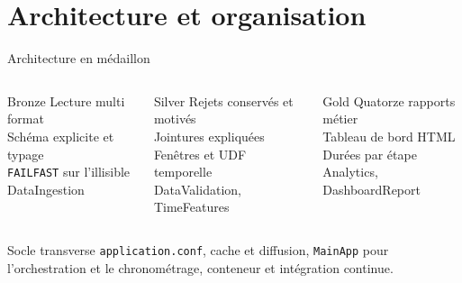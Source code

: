 \documentclass[aspectratio=169,11pt]{beamer}
\newcommand{\legende}[1]{{\color{gris}\footnotesize #1}}
\begin{document}
\section{Architecture et organisation}

\begin{frame}{Architecture en médaillon}
  \vspace{1mm}
  \begin{columns}[t,onlytextwidth]
      \begin{block}{Bronze}
        \footnotesize
        Lecture multi format\\
        Schéma explicite et typage\\
        \texttt{FAILFAST} sur l'illisible\\[2mm]
        \legende{DataIngestion}
      \end{block}
      \begin{block}{Silver}
        \footnotesize
        Rejets conservés et motivés\\
        Jointures expliquées\\
        Fenêtres et UDF temporelle\\[2mm]
        \legende{DataValidation, TimeFeatures}
      \end{block}
      \begin{block}{Gold}
        \footnotesize
        Quatorze rapports métier\\
        Tableau de bord HTML\\
        Durées par étape\\[2mm]
        \legende{Analytics, DashboardReport}
      \end{block}
  \end{columns}

  \vspace{6mm}
  \begin{block}{Socle transverse}
    \texttt{application.conf}, cache et diffusion, \texttt{MainApp} pour
    l'orchestration et le chronométrage, conteneur et intégration continue.
  \end{block}

\end{frame}
\end{document}
